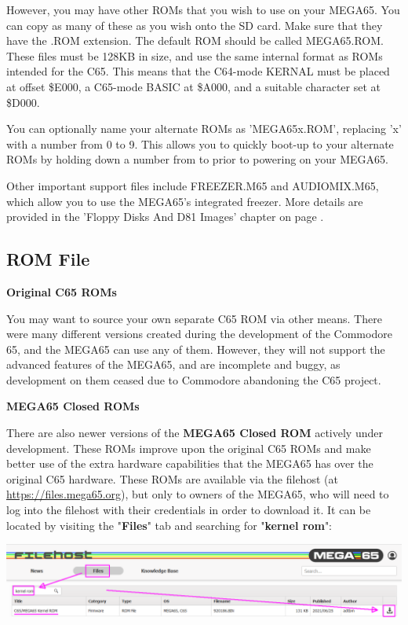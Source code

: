 However, you may have other ROMs that you wish to
use on your MEGA65.
You can copy as many of these as you wish onto the
SD card.  Make sure that they have the .ROM extension.  The default ROM
should be called MEGA65.ROM. These files
must be 128KB in size, and use the same internal format as ROMs
intended for the C65.  This means that the C64-mode KERNAL must be
placed at offset \$E000, a C65-mode BASIC at \$A000, and a suitable
character set at \$D000.

You can optionally name your alternate ROMs as 'MEGA65x.ROM', replacing 'x' with a number from 0 to 9.
This allows you to quickly boot-up to your alternate ROMs by holding down a number from  to  prior
to powering on your MEGA65.

Other important support files include FREEZER.M65 and AUDIOMIX.M65, which
allow you to use the MEGA65's integrated freezer. More details are provided in the 'Floppy Disks And D81 Images'
chapter on page \pageref{cha:freezer}.

\subsection{ROM File}

\textbf{Original C65 ROMs}

You may want to source your own separate C65 ROM via other means.
There were many different versions created during the development of the Commodore 65,
and the MEGA65 can use any of them.  However, they will not support the advanced
features of the MEGA65, and are incomplete and buggy, as development on them ceased
due to Commodore abandoning the C65 project.

\textbf{MEGA65 Closed ROMs}

There are also newer versions of the \textbf{MEGA65 Closed ROM} actively under development. These ROMs improve upon the original C65 ROMs and make better use of the extra hardware capabilities that the MEGA65 has over the original C65 hardware. These ROMs are available via the filehost (at \url{https://files.mega65.org}), but only to owners of the MEGA65, who will need to log into the filehost with their credentials in order to download it. It can be located by visiting the "\textbf{Files}" tab and searching for "\textbf{kernel rom}":

\includegraphics[width=\linewidth]{images/latest_closed_rom.png}

